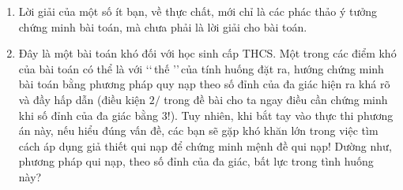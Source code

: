 \begin{bt}
{\begin{nx}
\begin{enumerate}
\begin{itemize}
\begin{itemize}
					\end{itemize}
					Lưu ý rằng, từ giả thiết \lq\lq tất cả các cạnh và đường chéo của đa giác $A_1A_2\ldots A_{m+1}$ đã được tô màu thỏa mãn các điều kiện của đề bài\rq\rq, chỉ đương nhiên có điều thứ hai cần chứng minh trên đây, mà không đương nhiên có điều thứ nhất.
					\item[+] Một số bạn khác đã chứng minh mệnh đề qui nạp theo cách sau:
					\begin{itemize}
						\item[-] Xét $(m+1)$-giác $A_1A_2\ldots A_{m+1}$.
						\item[-] Tô tất cả các cạnh và đường chéo của đa giác $A_2A_3\ldots A_{m+1}$, đảm bảo thỏa mãn các điều kiện của đề bài. Khi đó, theo giả thiết qui nạp, số màu được dùng để tô không thể vượt quá $2$.
						\item[-] Tiếp theo, bằng phương pháp phản chứng, chứng minh rằng không thể dùng thêm màu thứ ba để tô các cạnh và các đường chéo còn lại (chưa được tô) của đa giác $A_1A_2\ldots A_{m+1}$, sao cho các điều kiện của đề bài được thỏa mãn.\\
						\textit{Điểm chưa được ở cách giải trên là các bạn mới chỉ chứng minh rằng số màu dùng để tô không thể vượt quá $2$, trong một cách tô đặt biệt, cụ thể, trong khi phải chứng minh điều đó đúng trong mọi cách tô thỏa mãn các điều kiện của đề bài.}
					\end{itemize}
				\end{itemize}
				\item Lời giải của một số ít bạn, về thực chất, mới chỉ là các phác thảo ý tưởng chứng minh bài toán, mà chưa phải là lời giải cho bài toán.
				\item Đây là một bài toán khó đối với học sinh cấp THCS. Một trong các điểm khó của bài toán có thể là với \lq\lq\,thế \rq\rq\,của tính huống đặt ra, hướng chứng minh bài toán bằng phương pháp quy nạp theo số đỉnh của đa giác hiện ra khá rõ và đầy hấp dẫn (điều kiện $2/$ trong đề bài cho ta ngay điều cần chứng minh khi số đỉnh của đa giác bằng $3!$). Tuy nhiên, khi bắt tay vào thực thi phương án này, nếu hiểu đúng vấn đề, các bạn sẽ gặp khó khăn lớn trong việc tìm cách áp dụng giả thiết qui nạp để chứng minh mệnh đề qui nạp! Dường như, phương pháp qui nạp, theo số đỉnh của đa giác, bất lực trong tình huống này?
			\end{enumerate}
		\end{nx}
	}
\end{bt}
